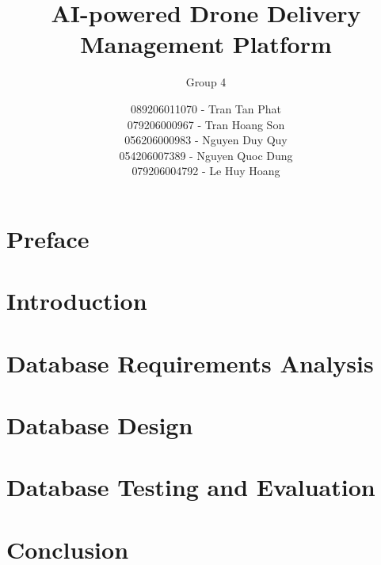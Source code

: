 \documentclass[letterpaper,11pt,leqno,openany]{book}
\begin{document}
\title{AI-powered Drone Delivery Management Platform }


\subtitle{Group 4}

\author{089206011070 - Tran Tan Phat\\
        079206000967 - Tran Hoang Son\\
        056206000983 - Nguyen Duy Quy\\
        054206007389 - Nguyen Quoc Dung\\
        079206004792 - Le Huy Hoang}

\begin{titlepage}
\maketitle
\end{titlepage}

\frontmatter

\tableofcontents

\chapter{Preface}


\chapter{Introduction}\label{c:introduction}


\chapter{Database Requirements Analysis}\label{c:analysis}


\chapter{Database Design}\label{c:design}


\chapter{Database Testing and Evaluation}\label{c:test}


\chapter{Conclusion} \label{c:conclusion}

\end{document}
